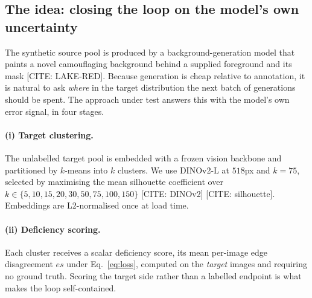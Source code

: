 \documentclass{article}
\begin{document}
\subsection{The idea: closing the loop on the model's own uncertainty}

The synthetic source pool is produced by a background-generation model that
paints a novel camouflaging background behind a supplied foreground and its mask
[CITE: LAKE-RED]. Because generation is cheap relative to annotation, it is
natural to ask \emph{where} in the target distribution the next batch of
generations should be spent. The approach under test answers this with the
model's own error signal, in four stages.

\paragraph{(i) Target clustering.}
The unlabelled target pool is embedded with a frozen vision backbone and
partitioned by $k$-means into $k$ clusters. We use DINOv2-L at $518$px and
$k = 75$, selected by maximising the mean silhouette coefficient over
$k \in \{5,10,15,20,30,50,75,100,150\}$ [CITE: DINOv2] [CITE: silhouette].
Embeddings are L2-normalised once at load time.

\paragraph{(ii) Deficiency scoring.}
Each cluster receives a scalar deficiency score, its mean per-image edge
disagreement $\mathit{es}$ under Eq.~\ref{eq:loss}, computed on the
\emph{target} images and requiring no ground truth. Scoring the target side
rather than a labelled endpoint is what makes the loop self-contained.
\end{document}

